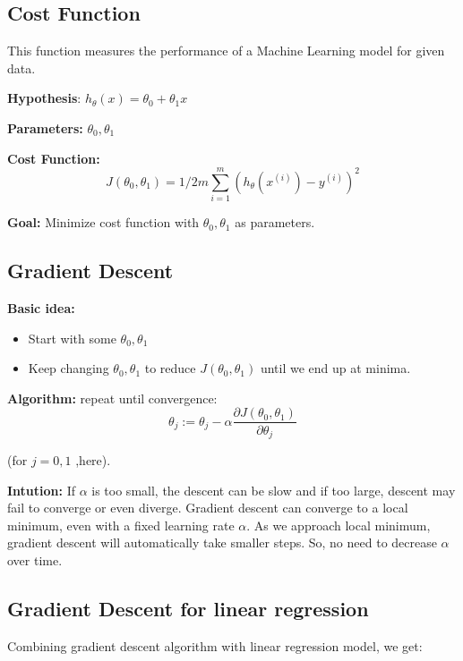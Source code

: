 \documentclass[12pt, A4]{report}
\begin{document}
  \subsection*{Cost Function}
    This function measures the performance of a Machine Learning model for given data.

    \textbf{Hypothesis}: $ h_ \theta(x) = \theta_0 + \theta_1x $

    \textbf{Parameters:} $ \theta_0, \theta_1 $

    \textbf{Cost Function:} 
    \begin{equation} \label {eq:1}
        J( \theta_0, \theta_1 ) = 1/2m \sum_{i=1}^{m} (h_\theta(x^{(i)})-y^{(i)})^2 
    \end{equation} 

    \textbf{Goal:} Minimize cost function with $ \theta_0, \theta_1 $ as parameters.

  \subsection*{Gradient Descent}

    \textbf{Basic idea:}
    \begin{itemize}
    \item Start with some $ \theta_0, \theta_1 $
    \item Keep changing $ \theta_0, \theta_1 $ to reduce $ J(\theta_0, \theta_1) $ until we end up at minima.
    \end{itemize} 

    \textbf{Algorithm:}
     repeat until convergence:
    \begin{equation} \label {eq:2}
        \theta_j := \theta_j - \alpha \frac{\partial {J(\theta_0, \theta_1)}}{\partial \theta_j}
    \end{equation} 

    (for  $j = 0, 1 $  ,here).  

    \textbf{Intution:} 
    If $\alpha$ is too small, the descent can be slow and if too large, descent may fail to converge or even diverge.
    Gradient descent can converge to a local minimum, even with a fixed learning rate $\alpha$. As we approach local minimum, gradient descent will automatically take smaller steps. So, no need to decrease $\alpha$ over time. 

  \subsection*{Gradient Descent for linear regression}
    Combining gradient descent algorithm with linear regression model, we get:
\end{document}
